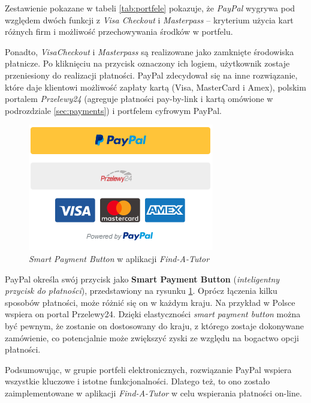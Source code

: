 \documentclass[12pt]{article}
\numberwithin{figure}{section}
\begin{document}
\begin{sloppypar}
Zestawienie pokazane w tabeli \ref{tab:portfele} pokazuje, że \textit{PayPal} wygrywa pod względem dwóch funkcji z \textit{Visa Checkout} i \textit{Masterpass} -- kryterium użycia kart różnych firm i możliwość przechowywania środków w portfelu.

Ponadto, \textit{VisaCheckout} i \textit{Masterpass} są realizowane jako zamknięte środowiska płatnicze. Po kliknięciu na przycisk oznaczony ich logiem, użytkownik zostaje przeniesiony do realizacji płatności. PayPal zdecydował się na inne rozwiązanie, które daje klientowi możliwość zapłaty kartą (Visa, MasterCard i Amex), polskim portalem \textit{Przelewy24} (agreguje płatności pay-by-link i kartą omówione w podrozdziale \ref{sec:payments}) i portfelem cyfrowym PayPal. 

\begin{figure}[htbp] 
 	\centering
	\includegraphics[scale=1.0]{images/chapter_2/paypal-button.png}
	\caption{\textit{Smart Payment Button} w aplikacji \textit{Find-A-Tutor}}
	\label{fig:paypal-button}
\end{figure}

PayPal określa swój przycisk jako \textbf{Smart Payment Button} (\textit{inteligentny przycisk do płatności}), przedstawiony na rysunku \ref{fig:paypal-button}. Oprócz łączenia kilku sposobów płatności, może różnić się on w każdym kraju. Na przykład w Polsce wspiera on portal Przelewy24. Dzięki elastyczności \textit{smart payment button} można być pewnym, że zostanie on dostosowany do kraju, z którego zostaje dokonywane zamówienie, co potencjalnie może zwiększyć zyski ze względu na bogactwo opcji płatności. 

Podsumowując, w grupie portfeli elektronicznych, rozwiązanie PayPal wspiera wszystkie kluczowe i istotne funkcjonalności. Dlatego też, to ono zostało zaimplementowane w aplikacji \textit{Find-A-Tutor} w celu wspierania płatności on-line.


\end{sloppypar}
\end{document}
